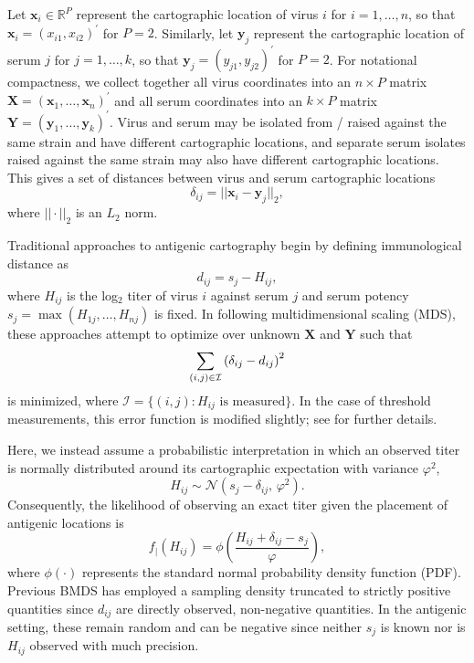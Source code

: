 \documentclass[11pt,oneside,letterpaper]{article}
\newcommand{\virus}{\mathbf{x}}						%
\newcommand{\serum}{\mathbf{y}}						%
\newcommand{\viruses}{\mathbf{X}}					%
\newcommand{\sera}{\mathbf{Y}}						%
\newcommand{\se}{s}									%
\newcommand{\point}{f_{\scriptscriptstyle \vert}}	%
\newcommand{\mdssd}{\varphi}						%
\newcommand{\vn}{n}									%
\newcommand{\sn}{k}									%
\newcommand{\normal}{\mathcal{N}}					%
\begin{document}
Let $\virus_i \in \mathbb{R}^{P}$ represent the cartographic location of virus $i$ for $i = 1,\ldots,\vn$, so that $\virus_i = (x_{i1}, x_{i2})^{\prime}$ for $P=2$. 
Similarly, let $\serum_j$ represent the cartographic location of serum $j$ for $j = 1,\ldots,\sn$, so that $\serum_j = (y_{j1},y_{j2})^{\prime}$ for $P=2$.
For notational compactness, we collect together all virus coordinates into an $\vn \times P$ matrix  $\viruses = (\virus_1, \ldots, \virus_{\vn})^{\prime}$ and all serum coordinates into an $\sn \times P$ matrix $\sera = (\serum_{1},\ldots,\serum_{\sn})^{\prime}$.
Virus and serum may be isolated from / raised against the same strain and have different cartographic locations, and separate serum isolates raised against the same strain may also have different cartographic locations. 
This gives a set of distances between virus and serum cartographic locations 
\begin{equation}
	\delta_{ij} =  || \virus_i - \serum_j ||_2,
\end{equation}
where $|| \cdot ||_2$ is an $L_2$ norm.

Traditional approaches to antigenic cartography \cite{Smith04} begin by defining immunological distance as
\begin{equation}
	d_{ij} =  \se_j - H_{ij},
\end{equation}
where $H_{ij}$ is the log$_2$ titer of virus $i$ against serum $j$ and serum potency $\se_j = \max ( H_{1j},\ldots,H_{\vn j} )$ is fixed.
In following multidimensional scaling (MDS), these approaches attempt to optimize over unknown $\viruses$ and $\sera$ such that
\begin{equation} \label{mds}
	\sum_{(i,j) \in \cal I} 
	\left(
		\delta_{ij} - d_{ij}
	\right)^2
\end{equation}
is minimized, where $\mathcal{I} = \{ (i,j) : H_{ij} \mbox{ is measured} \}$.
In the case of threshold measurements, this error function is modified slightly; see \cite{Smith04} for further details.

Here, we instead assume a probabilistic interpretation in which an observed titer is normally distributed around its cartographic expectation with variance $\mdssd^2$,
\begin{equation} \label{hij}
	H_{ij} \sim \normal( \se_j - \delta_{ij}, \, \mdssd^2 ).
\end{equation}
Consequently, the likelihood of observing an exact titer given the placement of antigenic locations is 
\begin{equation} 
	\point(H_{ij}) = \phi \left( \frac{ H_{ij} + \delta_{ij} - \se_j }{ \mdssd } \right),
\end{equation}
where $\phi(\cdot)$ represents the standard normal probability density function (PDF).
Previous BMDS has employed a sampling density truncated to strictly positive quantities since $d_{ij}$ are directly observed, non-negative quantities.  
In the antigenic setting, these remain random and can be negative since neither $\se_j$ is known nor is $H_{ij}$ observed with much precision. 
\end{document}
